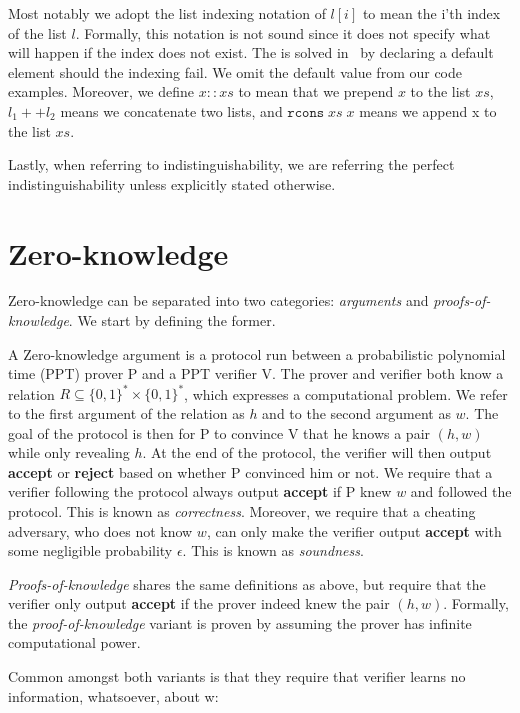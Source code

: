 Most notably we adopt the list indexing notation of $l[i]$ to mean the i'th
index of the list $l$. Formally, this notation is not sound since it does not
specify what will happen if the index does not exist. The is solved in \easycrypt\
by declaring a default element should the indexing fail. We omit
the default value from our code examples.
Moreover, we define $x::xs$ to mean that we prepend $x$ to the list $xs$,
$l_{1} ++ l_{2}$ means we concatenate two lists, and $\texttt{rcons} \; xs \; x$ means we
append x to the list $xs$.

Lastly, when referring to indistinguishability, we are referring the perfect
indistinguishability unless explicitly stated otherwise.

\section{Zero-knowledge}
\label{sec:background:zero-knowledge}
Zero-knowledge can be separated into two categories: \textit{arguments} and
\textit{proofs-of-knowledge}. We start by defining the former.

A Zero-knowledge argument is a protocol run between a probabilistic polynomial
time (PPT) prover P and a PPT verifier V. The prover and verifier both
know a relation $R \subseteq \{0,1\}^{*} \times \{0,1\}^*$, which expresses a
computational problem. We refer to the first argument of the relation as $h$ and
to the second argument as $w$.
The goal of the protocol is then for P to convince V that he knows a pair
$(h,w)$ while only revealing $h$. At the end of the protocol, the verifier will
then output \textbf{accept} or \textbf{reject} based on whether P convinced
him or not.
We require that a verifier following the protocol always output
\textbf{accept} if P knew $w$ and followed the protocol.
This is known as \textit{correctness}.
Moreover, we require that a cheating adversary, who does not know $w$, can
only make the verifier output \textbf{accept} with some negligible probability
$\epsilon$. This is known as \textit{soundness}.

\textit{Proofs-of-knowledge} shares the same definitions
as above, but require that the verifier only output \textbf{accept} if the
prover indeed knew the pair $(h,w)$. Formally, the \textit{proof-of-knowledge}
variant is proven by assuming the prover has infinite computational power.


Common amongst both variants is that they require that verifier learns no
information, whatsoever, about w:

